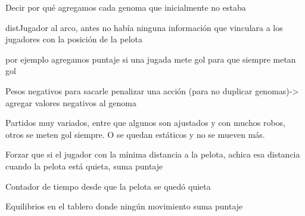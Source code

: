 Decir por qué agregamos cada genoma que inicialmente no estaba

distJugador al arco, antes no había ninguna información que vinculara a los jugadores con la posición de la pelota

por ejemplo agregamos puntaje si una jugada mete gol para que siempre metan gol

Pesos negativos para sacarle penalizar una acción (para no duplicar genomas)-> agregar valores negativos al genoma

Partidos muy variados, entre que algunos son ajustados y con muchos robos, otros se meten gol siempre. O se quedan estáticos y no se mueven más.

Forzar que si el jugador con la mínima distancia a la pelota, achica esa distancia cuando la pelota está quieta, suma puntaje

Contador de tiempo desde que la pelota se quedó quieta

Equilibrios en el tablero donde ningún movimiento suma puntaje



